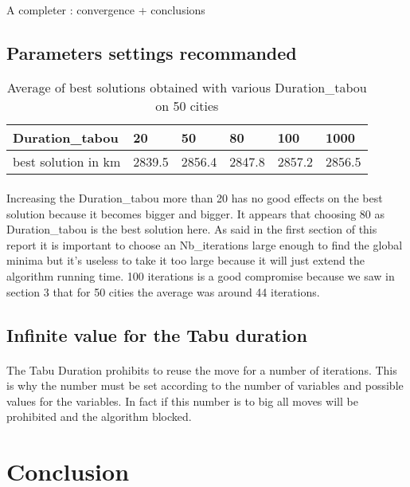 \documentclass[12pt,oneside,a4paper]{article}
\begin{document}
\paragraph{}
A completer : convergence + conclusions

\subsection{Parameters settings recommanded}
\begin{table}[h]
    \centering
    \small
    \begin{tabular}{llllll}
      \hline
      \multicolumn{1}{|l|}{\textbf{Duration\_tabou}}& \multicolumn{1}{l|}{\textbf{20}} & \multicolumn{1}{l|}{\textbf{50}} & \multicolumn{1}{l|}{\textbf{80}} & \multicolumn{1}{l|}{\textbf{100}} & \multicolumn{1}{l|}{\textbf{1000}}\\ \hline
      \multicolumn{1}{|l|}{best solution in km } & \multicolumn{1}{l|}{2839.5}  & \multicolumn{1}{l|}{2856.4}  & \multicolumn{1}{l|}{2847.8}   & \multicolumn{1}{l|}{2857.2}  & \multicolumn{1}{l|}{2856.5} \\ \hline
    \end{tabular}
    \caption{Average of best solutions obtained with various Duration\_tabou on 50 cities}
  \end{table}
\paragraph{}
    Increasing the Duration\_tabou more than 20 has no good effects on the best solution because it becomes bigger and bigger. 
    It appears that choosing 80 as Duration\_tabou is the best solution here. As said in the first section of this report
    it is important to choose an Nb\_iterations large enough to find the global minima but it's useless to take it too large
    because it will just extend the algorithm running time. 100 iterations is a good compromise because we saw in section 3 that
    for 50 cities the average was around 44 iterations.

\subsection{Infinite value for the Tabu duration}
\paragraph{}
  The Tabu Duration prohibits to reuse the move for a number of iterations. This is why the number must be set according to the number of variables 
  and possible values for the variables. In fact if this number is to big all moves will be prohibited and the algorithm blocked.
\section{Conclusion}
\paragraph{}
\end{document}
